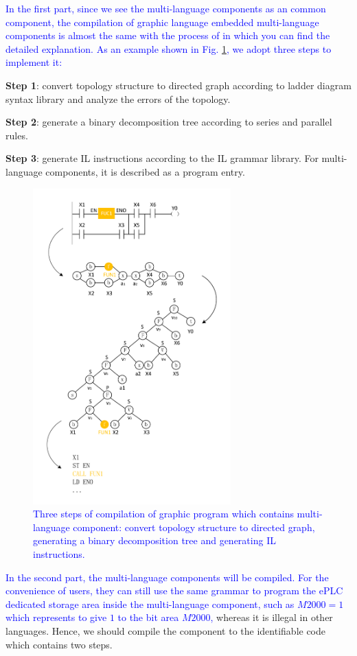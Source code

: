 \documentclass[journal,UTF8]{IEEEtran}
\begin{document}
  \textcolor{blue}{In the first part, since we see the multi-language components as an common component, the compilation of graphic language embedded multi-language components is almost the same with the process of \cite{Yan2010Compiling} in which you can find the detailed explanation. As an example shown in Fig. \ref{fig:Compile}, we adopt three steps to implement it:}
 	
 \textbf{Step 1}: convert topology structure to directed graph according to ladder diagram syntax library and analyze the errors of the topology.
 	
 \textbf{Step 2}: generate a binary decomposition tree according to series and parallel rules.
 	
 \textbf{Step 3}: generate IL instructions according to the IL grammar library. For multi-language components, it is described as a program entry.
 
 \begin{figure}
 	\centering
 	\includegraphics[width=3in]{fig/Compile.pdf}
 	\caption{\textcolor{blue}{Three steps of compilation of graphic program which contains multi-language component: convert topology structure to directed graph, generating a binary decomposition tree and generating IL instructions.}}
 	\label{fig:Compile}
 \end{figure}
 
 \textcolor{blue}{In the second part, the multi-language components will be compiled. For the convenience of users, they can still use the same grammar to program the ePLC dedicated storage area inside the multi-language component, such as $M2000=1$ which represents to give $1$ to the bit area $M2000$,} whereas it is illegal in other languages. Hence, we should compile the component to the identifiable code which contains two steps.
 	
\end{document}
